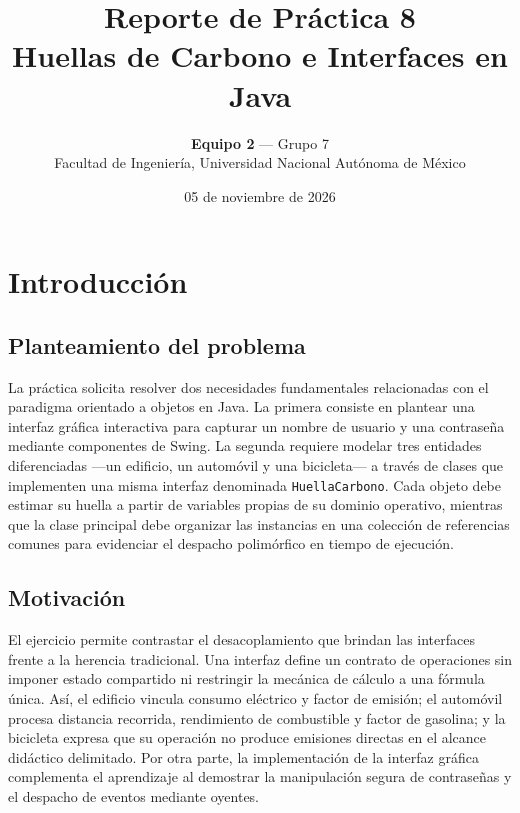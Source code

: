 \documentclass[letterpaper,12pt,oneside]{article}
\title{\textbf{Reporte de Pr\'actica 8}\\\large Huellas de Carbono e Interfaces en Java}
\author{\textbf{Equipo 2} --- Grupo 7\\Facultad de Ingenier\'ia, Universidad Nacional Aut\'onoma de M\'exico}
\date{05 de noviembre de 2026}
\numberwithin{figure}{section}
\begin{document}
\ifdefined\PortadaPDF
  
\else
  \PackageError{reporte}{Falta definir PortadaPDF}{Inyecte la ruta privada de la portada convertida al compilar mediante -Z search-path con portada_config.tex o definiendo \string\PortadaPDF.}
\fi

\tableofcontents
\clearpage

\section{Introducci\'on}

\subsection{Planteamiento del problema}
La pr\'actica solicita resolver dos necesidades fundamentales relacionadas con el paradigma orientado a objetos en Java. La primera consiste en plantear una interfaz gr\'afica interactiva para capturar un nombre de usuario y una contrase\~na mediante componentes de Swing. La segunda requiere modelar tres entidades diferenciadas ---un edificio, un autom\'ovil y una bicicleta--- a trav\'es de clases que implementen una misma interfaz denominada \texttt{HuellaCarbono}. Cada objeto debe estimar su huella a partir de variables propias de su dominio operativo, mientras que la clase principal debe organizar las instancias en una colecci\'on de referencias comunes para evidenciar el despacho polim\'orfico en tiempo de ejecuci\'on.

\subsection{Motivaci\'on}
El ejercicio permite contrastar el desacoplamiento que brindan las interfaces frente a la herencia tradicional. Una interfaz define un contrato de operaciones sin imponer estado compartido ni restringir la mec\'anica de c\'alculo a una f\'ormula \'unica. As\'i, el edificio vincula consumo el\'ectrico y factor de emisi\'on; el autom\'ovil procesa distancia recorrida, rendimiento de combustible y factor de gasolina; y la bicicleta expresa que su operaci\'on no produce emisiones directas en el alcance did\'actico delimitado. Por otra parte, la implementaci\'on de la interfaz gr\'afica complementa el aprendizaje al demostrar la manipulaci\'on segura de contrase\~nas y el despacho de eventos mediante oyentes.
\end{document}
